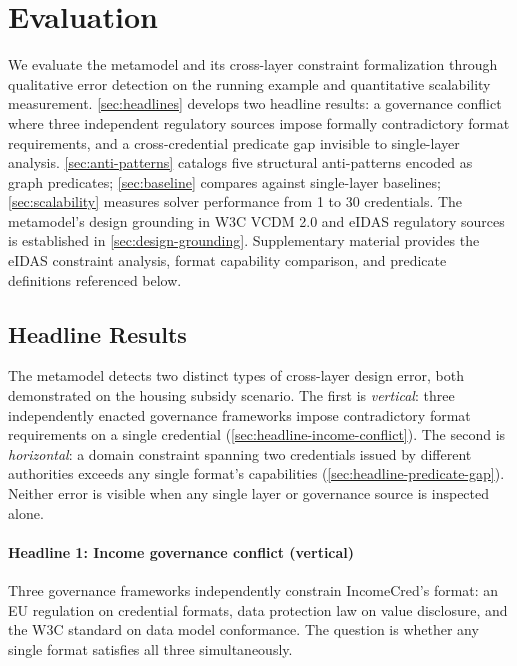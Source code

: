 \section{Evaluation}\label{sec:evaluation}

We evaluate the metamodel and its cross-layer constraint formalization through qualitative error detection on the running example and quantitative scalability measurement. \autoref{sec:headlines} develops two headline results: a governance conflict where three independent regulatory sources impose formally contradictory format requirements, and a cross-credential predicate gap invisible to single-layer analysis. \autoref{sec:anti-patterns} catalogs five structural anti-patterns encoded as graph predicates; \autoref{sec:baseline} compares against single-layer baselines; \autoref{sec:scalability} measures solver performance from 1 to 30 credentials. The metamodel's design grounding in W3C VCDM 2.0 and eIDAS regulatory sources is established in \autoref{sec:design-grounding}. Supplementary material provides the eIDAS constraint analysis, format capability comparison, and predicate definitions referenced below.

\subsection{Headline Results}\label{sec:headlines}

The metamodel detects two distinct types of cross-layer design error, both demonstrated on the housing subsidy scenario. The first is \emph{vertical}: three independently enacted governance frameworks impose contradictory format requirements on a single credential (\autoref{sec:headline-income-conflict}). The second is \emph{horizontal}: a domain constraint spanning two credentials issued by different authorities exceeds any single format's capabilities (\autoref{sec:headline-predicate-gap}). Neither error is visible when any single layer or governance source is inspected alone.

\paragraph{Headline 1: Income governance conflict (vertical)}\label{sec:headline-income-conflict}

Three governance frameworks independently constrain IncomeCred's format: an EU regulation on credential formats, data protection law on value disclosure, and the W3C standard on data model conformance. The question is whether any single format satisfies all three simultaneously.

